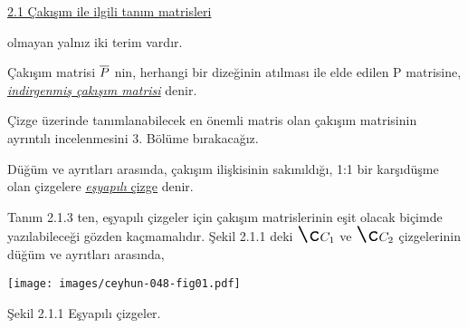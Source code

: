 \documentclass[12pt]{article}
\begin{document}

	\underline{2.1 Çakışım ile ilgili tanım matrisleri}

	olmayan yalnız iki terim vardır. \\

	\begin{definition}
	
	Çakışım matrisi ${\LARGE \overline{P}}$ nin, herhangi bir dizeğinin atılması ile elde edilen {\LARGE P} matrisine, \underline{\textit{indirgenmiş çakışım matrisi}} denir. \\

	\end{definition}

	Çizge üzerinde tanımlanabilecek en önemli matris olan çakışım matrisinin ayrıntılı incelenmesini 3. Bölüme bırakacağız. \\

	\begin{definition}

	Düğüm ve ayrıtları arasında, çakışım ilişkisinin sakınıldığı, 1:1 bir karşıdüşme olan çizgelere \underline{\emph{eşyapılı} çizge} denir. \\

	\end{definition}

	Tanım 2.1.3 ten, eşyapılı çizgeler için çakışım matrislerinin eşit olacak biçimde yazılabileceği gözden kaçmamalıdır. Şekil 2.1.1 deki $\LARGE{Ç_{1}}$ ve $\LARGE{Ç_{2}}$ çizgelerinin düğüm ve ayrıtları arasında,

	\texttt{[image: images/ceyhun-048-fig01.pdf]} %

	Şekil 2.1.1 Eşyapılı çizgeler.
\end{document}
